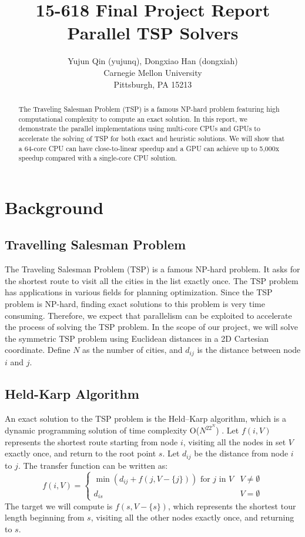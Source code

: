 \documentclass{article}
\begin{document}
\title{15-618 Final Project Report\\ Parallel TSP Solvers}

\author{
    Yujun Qin (yujunq), Dongxiao Han (dongxiah)\\
    Carnegie Mellon University\\
    Pittsburgh, PA 15213 
}

\maketitle
\begin{abstract}
The Traveling Salesman Problem (TSP) is a famous NP-hard problem featuring high computational complexity to compute an exact solution. In this report, we demonstrate the parallel implementations using multi-core CPUs and GPUs to accelerate the solving of TSP for both exact and heuristic solutions. We will show that a 64-core CPU can have close-to-linear speedup and a GPU can achieve up to 5,000x speedup compared with a single-core CPU solution.
\end{abstract}

\section{Background}
\subsection{Travelling Salesman Problem}
    The Traveling Salesman Problem (TSP) is a famous NP-hard problem. It asks for the shortest route to visit all the cities in the list exactly once. The TSP problem has applications in various fields for planning optimization. Since the TSP problem is NP-hard, finding exact solutions to this problem is very time consuming. Therefore, we expect that parallelism can be exploited to accelerate the process of solving the TSP problem. In the scope of our project, we will solve the symmetric TSP problem using Euclidean distances in a 2D Cartesian coordinate. Define $N$ as the number of cities, and $d_{ij}$ is the distance between node $i$ and $j$.
\subsection{Held-Karp Algorithm}
    An exact solution to the TSP problem is the Held–Karp algorithm, which is a dynamic programming solution of time complexity O($N^22^N$) \cite{hk}. Let $f(i, V)$ represents the shortest route starting from node $i$, visiting all the nodes in set $V$ exactly once, and return to the root point $s$. Let $d_{ij}$ be the distance from node $i$ to $j$. The transfer function can be written as:
    $$f(i, V) = 
    \begin{cases}
        \min(d_{ij} + f(j, V - \{j\})) \text{ for } j \text{ in } V & V \neq \emptyset \\
        d_{is} & V = \emptyset
    \end{cases}$$
    The target we will compute is $f(s, V - \{s\})$, which represents the shortest tour length beginning from $s$, visiting all the other nodes exactly once, and returning to $s$.
\end{document}
